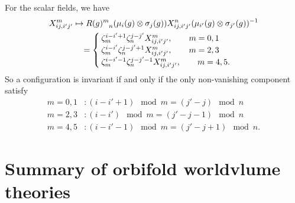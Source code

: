         For the scalar fields, we have
        \begin{align}
            X^m_{ij,i'j'}&\mapsto R(g)\indices{^m_n}(\mu_i(g)\otimes\sigma_j(g))X^n_{ij,i'j'}(\mu_{i'}(g)\otimes\sigma_{j'}(g))^{-1}\\
            &\quad =
            \begin{cases}
                \zeta^{i-i'+1}_m\zeta^{j-j'}_n X^m_{ij,i'j'},\qquad m=0,1\\
                \zeta^{i-i'}_m\zeta^{j-j'+1}_n X^m_{ij,i'j'},\qquad m=2,3\\
                \zeta^{i-i'-1}_m\zeta^{j-j'-1}_n X^m_{ij,i'j'},\qquad m=4,5.
            \end{cases}
        \end{align}
        So a configuration is invariant if and only if the only non-vanishing component satisfy
        \begin{align}
            m=0,1 &: (i-i'+1)\mod m = (j'-j)\mod n\\
            m=2,3 &: (i-i')\mod m = (j'-j-1)\mod n\\
            m=4,5 &: (i-i'-1)\mod m = (j'-j+1)\mod n.
        \end{align}

\section{Summary of orbifold worldvlume theories}

